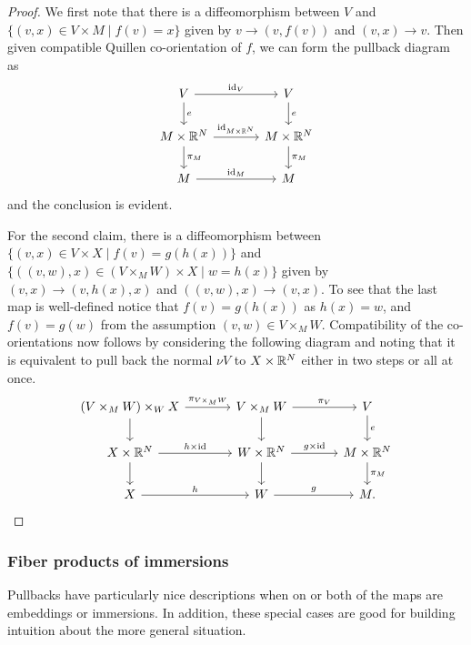 \begin{proof}
	We first note that there is a diffeomorphism between $V$ and $\{(v,x) \in V \times M \mid f(v) = x\}$ given by $v \to (v,f(v))$ and $(v,x) \to v$.
	Then given compatible Quillen co-orientation of $f$, we can form the pullback diagram as
	\[
	\begin{tikzcd}[column sep=large]
		V \arrow[r, "\id_V"] \arrow[d,"e"] & V \arrow[d,"e"] \\
		M \times \R^N \arrow[r, "\id_{M \times \R^N}"] \arrow[d,"\pi_M"] & M \times \R^N \arrow[d,"\pi_M"] \\
		M \arrow[r, "\id_M"] & M
	\end{tikzcd}
	\]
	and the conclusion is evident.

	For the second claim, there is a diffeomorphism between $\{(v,x) \in V \times X \mid f(v) = g(h(x))\}$ and $\{((v,w),x) \in (V \times_M W) \times X \mid w = h(x)\}$ given by $(v,x) \to (v,h(x),x)$ and $((v,w),x) \to (v,x)$.
	To see that the last map is well-defined notice that $f(v) = g(h(x))$ as $h(x) = w$, and $f(v) = g(w)$ from the assumption $(v,w) \in V \times_M W$.
	Compatibility of the co-orientations now follows by considering the following diagram and noting that it is equivalent to pull back the normal $\nu V$ to $X \times \mathbb{R}^N$ either in two steps or all at once.
	\[
	\begin{tikzcd}[column sep=large]
		(V \times_M W) \times_W X \arrow[r, "\pi_{V \times_M W}"] \arrow[d] & V \times_M W \arrow[r, "\pi_V"] \arrow[d] & V \arrow[d, "e"] \\
		X \times \R^N \arrow[r, "h \times \id"] \arrow[d] & W \times \R^N \arrow[r, "g \times \id"] \arrow[d] & M \times \R^N \arrow[d, "\pi_M"] \\
		X \arrow[r, "h"] & W \arrow[r, "g"] & M.
	\end{tikzcd}
	\]
\end{proof}

\subsubsection{Fiber products of immersions}\label{S: co-or product immersion}

Pullbacks have particularly nice descriptions when on or both of the maps are embeddings or immersions.
In addition, these special cases are good for building intuition about the more general situation.

